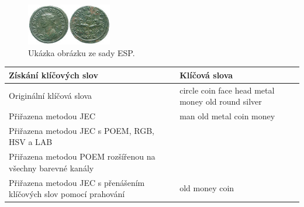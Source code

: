 \documentclass[czech,BP]{thesiskiv}
\begin{document}
\begin{figure}[H]
	\centering
	\includegraphics[width=140px]{./img/esp_86743.jpg}	
	\caption{Ukázka obrázku ze sady ESP.}
	\label{img:esp_coin}
\end{figure}

\begin{center}
	\begin{tabular}{| p{7cm} | p{7cm} |}
		\hline
		\textbf{Získání klíčových slov} & \textbf{Klíčová slova} \\ \hline
		Originální klíčová slova & circle coin face head metal money old round silver \\ \hline
		Přiřazena metodou JEC & man old metal coin money \\ \hline
		Přiřazena metodou JEC s POEM, RGB, HSV a LAB & \\ \hline 
		Přiřazena metodou POEM rozšířenou na všechny barevné kanály &  \\ \hline 
		Přiřazena metodou JEC s přenášením klíčových slov pomocí prahování & old money coin \\ \hline 
			
	\end{tabular}
\end{center}
	 
\end{document}

